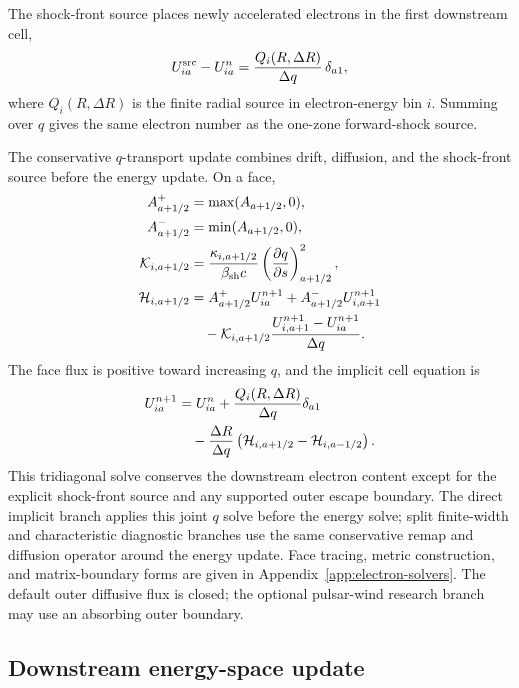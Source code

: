 \documentclass[twocolumn]{aastex702}
\begin{document}
The shock-front source places newly accelerated electrons in the first downstream
cell,
\begin{equation}
U_{ia}^{\rm src}-U_{ia}^{n}
=\frac{Q_i(R,\Delta R)}{\Delta q}\,\delta_{a1},
\end{equation}
where \(Q_i(R,\Delta R)\) is the finite radial source in electron-energy bin
\(i\).  Summing over \(q\) gives the same electron number as the one-zone
forward-shock source.

The conservative \(q\)-transport update combines drift, diffusion, and the
shock-front source before the energy update.  On a face,
\begin{equation}
\begin{aligned}
A_{a+1/2}^{+}&=\max(A_{a+1/2},0),\\
A_{a+1/2}^{-}&=\min(A_{a+1/2},0),\\
{\cal K}_{i,a+1/2}
&=\frac{\kappa_{i,a+1/2}}{\beta_{\rm sh}c}
\left(\frac{\partial q}{\partial s}\right)^2_{a+1/2},\\
{\cal H}_{i,a+1/2}
&=A_{a+1/2}^{+}U_{ia}^{n+1}
+A_{a+1/2}^{-}U_{i,a+1}^{n+1}\\
&\quad -{\cal K}_{i,a+1/2}
\frac{U_{i,a+1}^{n+1}-U_{ia}^{n+1}}{\Delta q}.
\end{aligned}
\end{equation}
The face flux is positive toward increasing \(q\), and the implicit cell equation
is
\begin{equation}
\begin{aligned}
U_{ia}^{n+1}
&=U_{ia}^{n}+\frac{Q_i(R,\Delta R)}{\Delta q}\delta_{a1}\\
&\quad -\frac{\Delta R}{\Delta q}
\left({\cal H}_{i,a+1/2}-{\cal H}_{i,a-1/2}\right).
\end{aligned}
\end{equation}
This tridiagonal solve conserves the downstream electron content except for the
explicit shock-front source and any supported outer escape boundary.  The direct
implicit branch applies this joint \(q\) solve before the energy solve; split
finite-width and characteristic diagnostic branches use the same conservative
remap and diffusion operator around the energy update.  Face tracing, metric
construction, and matrix-boundary forms are given in
Appendix~\ref{app:electron-solvers}.  The default outer diffusive flux is closed;
the optional pulsar-wind research branch may use an absorbing outer boundary.

\subsection{Downstream energy-space update}
\end{document}
